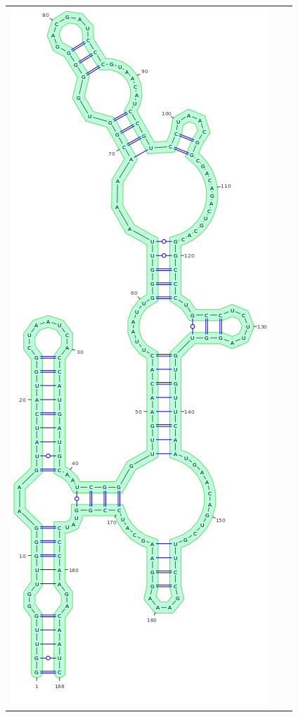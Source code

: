 \documentclass[11pt]{article} %
\begin{document}
{\newcommand{\MyScale}{.26}

\begin{figure}
{\centering
  \sf	\begin{adjustbox}{max width=\textwidth,max height=\textheight,keepaspectratio}
\begin{tabular}{@{}ccc@{}}

 \includegraphics[scale=\MyScale]{graphs/Supp_structures/native_structure}&

\end{tabular}
\end{adjustbox}}
\end{figure}}
\end{document}

